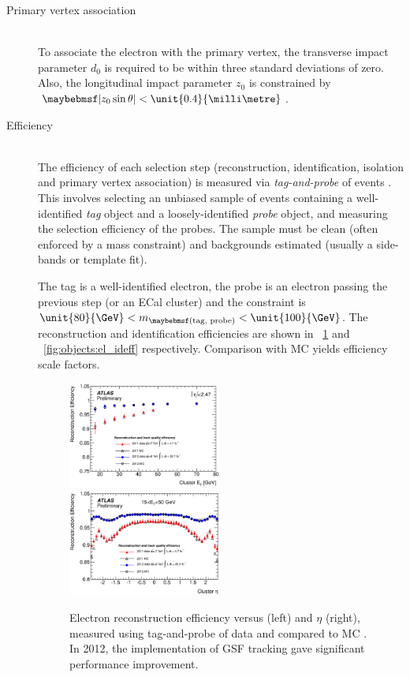\begin{description}
\item[Primary vertex association] \hfill \\
	To associate the electron with the primary vertex, the transverse impact parameter 
	$d_0$ is required to be within three standard deviations of zero. Also, the 
	longitudinal impact parameter $z_0$ is constrained by $\mods{z_0 \sin\theta} < 
	\unit{0.4}{\milli\metre}$.

\item[Efficiency] \hfill \\
	The efficiency of each selection step (reconstruction, identification, isolation and 
	primary vertex association) is measured via \textit{tag-and-probe} of 
	\HepProcess{\PZ \HepTo \Pe\Pe} events \cite{ElectronPerf:2010,ElectronPerf:2012}. 
	This involves selecting an unbiased sample of events containing a well-identified 
	\textit{tag} object and a loosely-identified \textit{probe} object, and measuring the 
	selection efficiency of the probes. The sample must be clean (often enforced by a 
	mass constraint) and backgrounds estimated (usually a side-bands or template fit).

	The tag is a well-identified electron, the probe is an electron passing the previous 
	step (or an \ac{ECal} cluster) and the constraint is $\unit{80}{\GeV} < 
	m_{\parenths{\text{tag, probe}}} < \unit{100}{\GeV}$. The reconstruction and 
	identification efficiencies are shown in \Figure~\ref{fig:objects:el_recoeff} and 
	\Figure~\ref{fig:objects:el_ideff} respectively. Comparison with MC yields efficiency 
	scale factors.

	\begin{figure}
		\includegraphics[width=0.495\textwidth]{tex/selection/el_recoeff_et}
		\hfill
		\includegraphics[width=0.495\textwidth]{tex/selection/el_recoeff_eta}
		\caption{Electron reconstruction efficiency versus \et (left) and $\eta$ (right), 
		measured using tag-and-probe of \HepProcess{\PZ \HepTo \Pe\Pe} data and compared 
		to MC \cite{ElectronPerf:2012}. In 2012, the implementation of GSF tracking gave 
		significant performance improvement.}
		\label{fig:objects:el_recoeff}
	\end{figure}


\end{description}
